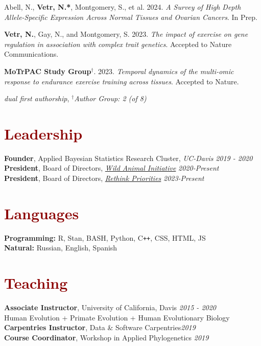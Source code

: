 \documentclass[11pt,margin,line]{resume}
\begin{document}
\begin{resume}
Abell, N., \textbf{Vetr, N.*},  Montgomery, S., et al.  2024.  \emph{A Survey of High Depth Allele-Specific Expression Across Normal Tissues and Ovarian Cancers}.  In Prep.

\textbf{Vetr, N.},  Gay,  N.,  and Montgomery,  S.  2023.  \emph{The impact of exercise on gene regulation in association with complex trait genetics}.  Accepted to Nature Communications.

\textbf{MoTrPAC Study Group}$^{\dag}$. 2023.  \emph{Temporal dynamics of the multi-omic response to endurance exercise training across tissues}.  Accepted to Nature. 

\vspace{-1.5mm}
{\hfill\small*\textit{dual first authorship}, $^{\dag}$\textit{Author Group: 2 (of 8)}}

\vspace{-1.5mm}
\section{\large\textcolor{DarkRed}{Leadership}}
\textbf{Founder}, Applied Bayesian Statistics Research Cluster, \textit{UC-Davis} \hfill \emph{2019 - 2020}\\
\textbf{President}, Board of Directors, \textit{\href{https://www.wildanimalinitiative.org/}{Wild Animal Initiative}} \hfill \emph{2020-Present}\\
\textbf{President}, Board of Directors, \textit{\href{https://rethinkpriorities.org/}{Rethink Priorities}} \hfill \emph{2023-Present}\\

\vspace{-5mm}
\section{\large\textcolor{DarkRed}{Languages}}
\textbf{Programming:} R, Stan, BASH, Python, C\texttt{++}, CSS, HTML, JS\\
\textbf{Natural:} Russian, English, Spanish

\vspace{-1.5mm}
\section{\large\textcolor{DarkRed}{Teaching}}
\textbf{Associate Instructor}, University of California, Davis \hfill \emph{2015  - 2020}
\\Human Evolution + Primate Evolution + Human Evolutionary Biology
\\\textbf{Carpentries Instructor}, Data \& Software Carpentries\hfill \emph{2019}
\\\textbf{Course Coordinator}, Workshop in Applied Phylogenetics \hfill \emph{2019}


\end{resume}
\end{document}
